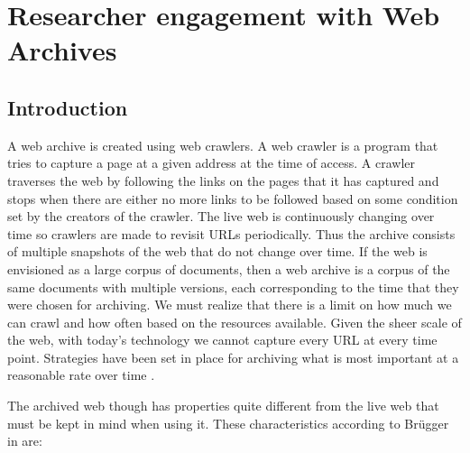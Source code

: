 \chapter{Researcher engagement with Web Archives} %
\label{cha:researcher_engagement_with_web_archives}

\section{Introduction} %
\label{sec:web_archives_vs_web}

A web archive is created using web crawlers. A web crawler is a program that tries to capture a page at a given address at the time of access. A crawler traverses the web by following the links on the pages that it has captured and stops when there are either no more links to be followed based on some condition set by the creators of the crawler. The live web is continuously changing over time so crawlers are made to revisit URLs periodically. Thus the archive consists of multiple snapshots of the web that do not change over time. If the web is envisioned as a large corpus of documents, then a web archive is a corpus of the same documents with multiple versions, each corresponding to the time that they were chosen for archiving. We must realize that there is a limit on how much we can crawl and how often based on the resources available. Given the sheer scale of the web, with today's technology we cannot capture every URL at every time point. Strategies have been set in place for archiving what is most important at a reasonable rate over time \cite{gomes2006design}.


The archived web though has properties quite different from the live web that must be kept in mind when using it. These characteristics according to Br\"ugger in \cite{brugger2013web} are:

